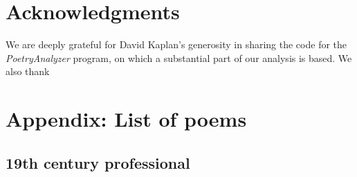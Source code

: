 \documentclass{book}
\begin{document}

\section*{Acknowledgments}
We are deeply grateful for David Kaplan's generosity in sharing the code for the \emph{PoetryAnalyzer} program, on which a substantial part of our analysis is based. We also thank 




\newpage
\section*{Appendix: List of poems}
\subsection*{19th century professional}
\end{document}
